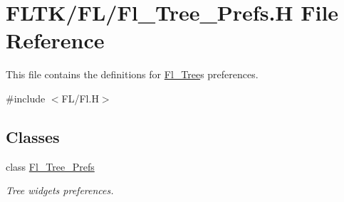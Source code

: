 \hypertarget{_fl___tree___prefs_8_h}{}\section{F\+L\+T\+K/\+F\+L/\+Fl\+\_\+\+Tree\+\_\+\+Prefs.H File Reference}
\label{_fl___tree___prefs_8_h}


This file contains the definitions for \hyperlink{class_fl___tree}{Fl\+\_\+\+Tree}\textquotesingle{}s preferences.  


{\ttfamily \#include $<$F\+L/\+Fl.\+H$>$}\newline
\subsection*{Classes}
\begin{DoxyCompactItemize}
\item 
class \hyperlink{class_fl___tree___prefs}{Fl\+\_\+\+Tree\+\_\+\+Prefs}
\begin{DoxyCompactList}\small\item\em Tree widget\textquotesingle{}s preferences. \end{DoxyCompactList}\end{DoxyCompactItemize}
